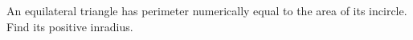 An equilateral triangle has perimeter numerically equal to the area of its incircle. Find its positive inradius.
